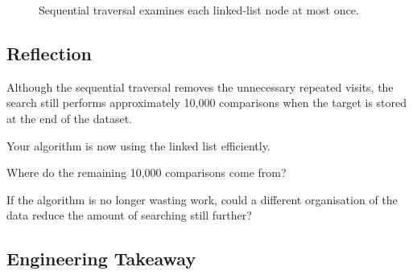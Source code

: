 \documentclass{csc2059practical}
\begin{document}
\begin{figure}[htbp]

    \caption{
        Sequential traversal examines each linked-list node at most once.
    }
    \label{fig:sequential-list-traversal}
\end{figure}



\subsection{Reflection}

Although the sequential traversal removes the unnecessary repeated visits, the
search still performs approximately 10,000 comparisons when the target is
stored at the end of the dataset.

\begin{reflectionbox}
Your algorithm is now using the linked list efficiently.

Where do the remaining 10,000 comparisons come from?

If the algorithm is no longer wasting work, could a different organisation of
the data reduce the amount of searching still further?
\end{reflectionbox}


\subsection{Engineering Takeaway}
\end{document}
